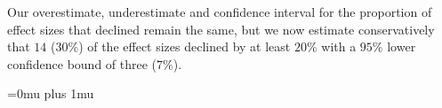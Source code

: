 \documentclass[11pt]{article}
\theoremstyle{definition}
\theoremstyle{custom}
\begin{document}
  Our overestimate, underestimate and confidence interval for the proportion of effect sizes that declined remain the same, but we now estimate conservatively that $14$ ($30\%$) of the effect sizes declined by at least $20\%$ with a $95\%$ lower confidence bound of three ($7\%$).

\Urlmuskip=0mu plus 1mu\relax


\end{document}
